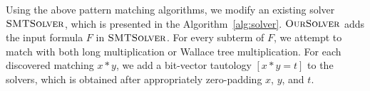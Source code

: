 Using the above pattern matching algorithms, we modify an existing
solver $\textsc{SMTSolver}$, which
is presented in the Algorithm~\ref{alg:solver}.
%
$\textsc{OurSolver}$ adds the input formula $F$ in $\textsc{SMTSolver}$.
%
For every subterm of $F$, we attempt to match with both long multiplication
or Wallace tree multiplication.
%
For each discovered matching $x*y$, we add a bit-vector tautology $[x*y = t]$ 
to the solvers, which is obtained after
appropriately zero-padding $x$, $y$, and $t$.
 



